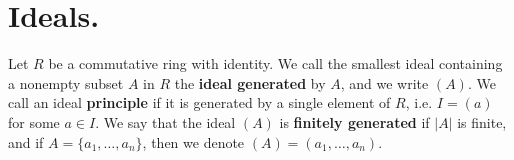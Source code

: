 \section{Ideals.}

\begin{definition}
    Let $R$ be a commutative ring with identity. We call the smallest ideal
    containing a nonempty subset $A$ in $R$ the  \textbf{ideal generated} by
    $A$, and we write $(A)$. We call an ideal \textbf{principle} if it is
    generated by a single element of $R$, i.e. $I=(a)$ for some $a \in I$. We
    say that the ideal $(A)$ is \textbf{finitely generated} if $|A|$ is finite,
    and if  $A=\{a_1, \dots, a_n\}$, then we denote $(A)=(a_1, \dots, a_n)$.
\end{definition}
